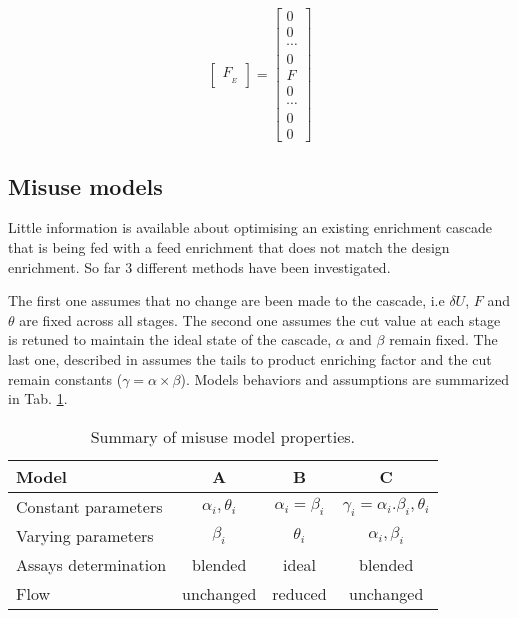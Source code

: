 \begin{equation}
\begin{bmatrix}
     F_{_{E}}
 \end{bmatrix}
 =
 \begin{bmatrix}
     0      \\
     0      \\
     \cdots \\
     0      \\
     F      \\
     0      \\
     \cdots \\
     0      \\
     0
\end{bmatrix}
\label{eq:flow}
\end{equation}



\subsection{Misuse models}

Little information is available about optimising an existing enrichment cascade
that is being fed with a feed enrichment that does not match the design
enrichment. So far 3 different methods have been investigated. 

The first one assumes that no change are been made to the cascade, i.e $\delta
U$, $F$ and $\theta$ are fixed across all stages. The second one assumes the cut
value at each stage is retuned to maintain the ideal state of the cascade,
$\alpha$ and $\beta$ remain fixed. The last one, described in \cite{walker.2017}
assumes the tails to product enriching factor and the cut remain constants ($\gamma =
\alpha\times\beta$). Models behaviors and assumptions are summarized in Tab.
\ref{tab:models}.

\begin{table}[htb]
\centering
  \caption{Summary of misuse model properties.}
\begin{tabular}{l|ccc}
\toprule

Model                &    A                 & B                  & C  \\
\midrule
Constant parameters  & $\alpha_i, \theta_i$ & $\alpha_i=\beta_i$ & $\gamma_i=\alpha_i .\beta_i, \theta_i$       \\
Varying parameters   & $\beta_i$            & $\theta_i$         & $\alpha_i, \beta_i$                     \\
Assays determination & blended              & ideal              & blended                  \\
Flow                 & unchanged            & reduced            & unchanged       \\

\bottomrule
\end{tabular}
  \label{tab:models}
\end{table}


